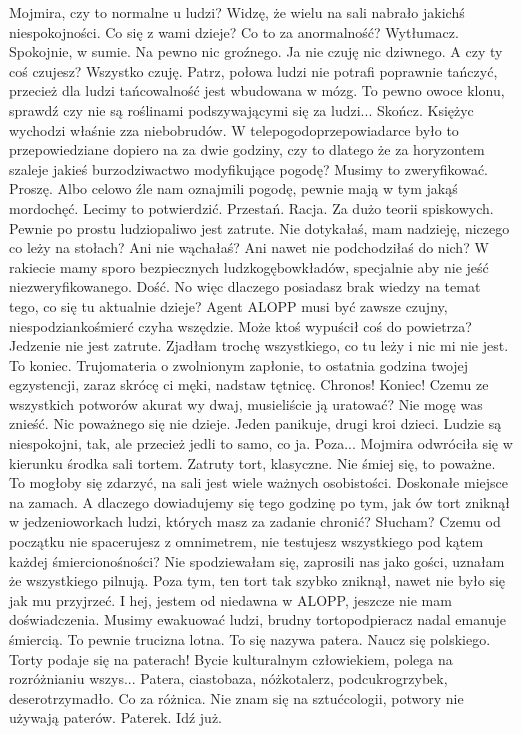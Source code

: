 \begin{dialogue}
\ds{} Mojmira, czy to normalne u ludzi? Widzę, że wielu na sali nabrało jakichś niespokojności. Co się z wami dzieje? Co to za anormalność? Wytłumacz.
\ds{} Spokojnie, w sumie. Na pewno nic groźnego. Ja nie czuję nic dziwnego. A czy ty coś czujesz?
\ds{} Wszystko czuję. Patrz, połowa ludzi nie potrafi poprawnie tańczyć, przecież dla ludzi tańcowalność jest wbudowana w mózg.
To pewno owoce klonu, sprawdź czy nie są roślinami podszywającymi się za ludzi...
\ds{} Skończ.
\ds{} Księżyc wychodzi właśnie zza niebobrudów. 
W telepogodoprzepowiadarce było to przepowiedziane dopiero na za dwie godziny, czy to dlatego że 
za horyzontem szaleje jakieś burzodziwactwo modyfikujące pogodę? Musimy to zweryfikować.
\ds{} Proszę.
\ds{} Albo celowo źle nam oznajmili pogodę, pewnie mają w tym jakąś mordochęć. Lecimy to potwierdzić.
\ds{} Przestań.
\ds{} Racja. Za dużo teorii spiskowych. Pewnie po prostu ludziopaliwo jest zatrute. 
Nie dotykałaś, mam nadzieję, niczego co leży na stołach? Ani nie wąchałaś? Ani nawet nie podchodziłaś do nich?
W rakiecie mamy sporo bezpiecznych ludzkogębowkładów, specjalnie aby nie jeść niezweryfikowanego.
\ds{} Dość. 
\ds{} No więc dlaczego posiadasz brak wiedzy na temat tego, co się tu aktualnie dzieje? 
Agent ALOPP musi być zawsze czujny, niespodziankośmierć czyha wszędzie. Może ktoś wypuścił coś do powietrza?
\ds{} Jedzenie nie jest zatrute. Zjadłam trochę wszystkiego, co tu leży i nic mi nie jest.
\ds{} To koniec. Trujomateria o zwolnionym zapłonie, to ostatnia godzina twojej egzystencji, zaraz skrócę ci męki, nadstaw tętnicę.
\ds{} Chronos! Koniec! Czemu ze wszystkich potworów akurat wy dwaj, musieliście ją uratować? Nie mogę was znieść. Nic poważnego się nie dzieje. 
Jeden panikuje, drugi kroi dzieci.
Ludzie są niespokojni, tak, ale przecież jedli to samo, co ja. Poza...
\dm{} Mojmira odwróciła się w kierunku środka sali \dm{} tortem.
\ds{} Zatruty tort, klasyczne.
\ds{} Nie śmiej się, to poważne. To mogłoby się zdarzyć, na sali jest wiele ważnych osobistości. Doskonałe miejsce na zamach.
\ds{} A dlaczego dowiadujemy się tego godzinę po tym, jak ów tort zniknął w jedzenioworkach ludzi, których masz za zadanie chronić? Słucham? 
Czemu od początku nie spacerujesz z omnimetrem, nie testujesz wszystkiego pod kątem każdej śmiercionośności?
\ds{} Nie spodziewałam się, zaprosili nas jako gości, uznałam że wszystkiego pilnują. Poza tym, ten tort tak szybko zniknął, nawet nie było się jak mu przyjrzeć. 
I hej, jestem od niedawna w ALOPP, jeszcze nie mam doświadczenia.
\ds{} Musimy ewakuować ludzi, brudny tortopodpieracz nadal emanuje śmiercią. To pewnie trucizna lotna.
\ds{} To się nazywa patera. Naucz się polskiego. Torty podaje się na paterach! Bycie kulturalnym człowiekiem, polega na rozróżnianiu wszys...
\ds{} Patera, ciastobaza, nóżkotalerz, podcukrogrzybek, deserotrzymadło. Co za różnica. Nie znam się na sztućcologii, potwory nie używają paterów.
\ds{} Paterek.
\ds{} Idź już.
\end{dialogue}

